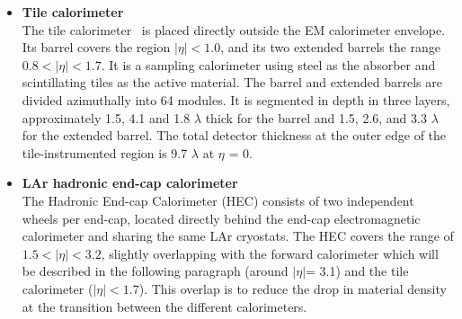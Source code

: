 \documentclass[letterpaper,12pt]{article}
\begin{document}
\begin{itemize}
		\item \textbf{Tile calorimeter} \\
		The tile calorimeter~\cite{ATLAS-TDR-03} is placed directly outside the EM calorimeter envelope. 
		Its	barrel covers the region $|\eta|< 1.0$, and its two extended barrels 
		the range $0.8 < |\eta|< 1.7$. It is a
		sampling calorimeter using steel as the absorber and scintillating tiles 
		as the active material. The	barrel and extended barrels are divided azimuthally 
		into 64 modules. 
		It is segmented in depth in three
		layers, approximately 1.5, 4.1 and 1.8 $\lambda$ 
		thick for the barrel and 1.5, 2.6, and
		3.3 $\lambda$ for the extended barrel. 
		The total detector thickness at the outer edge of the tile-instrumented
		region is 9.7 $\lambda$ at $\eta$ = 0. 
		\item  \textbf{LAr hadronic end-cap calorimeter} \\
		The Hadronic End-cap Calorimeter (HEC) consists of two
		independent wheels per end-cap, located directly behind the end-cap 
		electromagnetic calorimeter and sharing the same LAr cryostats. 
		The HEC covers the range of $1.5< |\eta|< 3.2$, 
		slightly overlapping with the forward calorimeter which 
		will be described in the following paragraph 
		(around $|\eta|$= 3.1) and the tile calorimeter ($|\eta|< 1.7$).
		This overlap is to reduce the drop in material 
		density at the transition between
		the different calorimeters.

\end{itemize}
\end{document}
